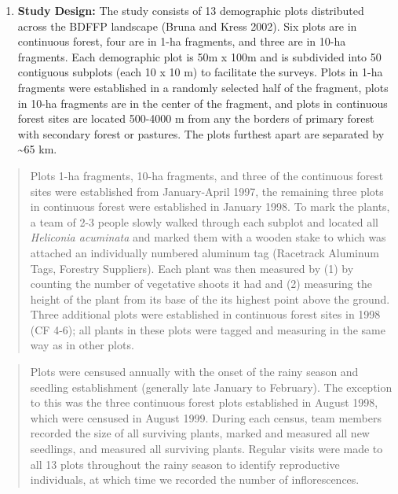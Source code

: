 \documentclass[
  english,
  man]{apa6}
\providecommand{\tightlist}{%
  \setlength{\itemsep}{0pt}\setlength{\parskip}{0pt}}
\begin{document}
\begin{enumerate}
\def\labelenumi{\alph{enumi}.}
\setcounter{enumi}{1}
\tightlist
\item
  \textbf{Study Design:} The study consists of 13 demographic plots
  distributed across the BDFFP landscape (Bruna and Kress 2002). Six
  plots are in continuous forest, four are in 1-ha fragments, and
  three are in 10-ha fragments. Each demographic plot is 50m x 100m
  and is subdivided into 50 contiguous subplots (each 10 x 10 m) to
  facilitate the surveys. Plots in 1-ha fragments were established in
  a randomly selected half of the fragment, plots in 10-ha fragments
  are in the center of the fragment, and plots in continuous forest
  sites are located 500-4000 m from any the borders of primary forest
  with secondary forest or pastures. The plots furthest apart are
  separated by \textasciitilde65 km.
\end{enumerate}

\begin{quote}
Plots 1-ha fragments, 10-ha fragments, and three of the continuous
forest sites were established from January-April 1997, the remaining
three plots in continuous forest were established in January 1998. To
mark the plants, a team of 2-3 people slowly walked through each
subplot and located all \emph{Heliconia acuminata} and marked them with a
wooden stake to which was attached an individually numbered aluminum
tag (Racetrack Aluminum Tags, Forestry Suppliers). Each plant was then
measured by (1) by counting the number of vegetative shoots it had and
(2) measuring the height of the plant from its base of the its highest
point above the ground. Three additional plots were established in
continuous forest sites in 1998 (CF 4-6); all plants in these plots
were tagged and measuring in the same way as in other plots.
\end{quote}

\begin{quote}
Plots were censused annually with the onset of the rainy season and
seedling establishment (generally late January to February). The
exception to this was the three continuous forest plots established in
August 1998, which were censused in August 1999. During each census,
team members recorded the size of all surviving plants, marked and
measured all new seedlings, and measured all surviving plants. Regular
visits were made to all 13 plots throughout the rainy season to
identify reproductive individuals, at which time we recorded the
number of inflorescences.
\end{quote}
\end{document}
